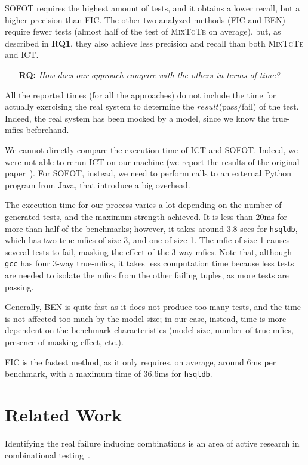 \documentclass[
12pt, %
oneside, %
english, %
singlespacing, %
headsepline, %
consistentlayout, %
]{MastersDoctoralThesis} %
\newcommand{\mix}{\textsc{MixTgTe}\xspace}
\newcommand{\truemfics}{true-\textsf{mfics}\xspace}
\newcommand{\mfic}{\textsf{mfic}\xspace}
\newcommand{\mfics}{\textsf{mfics}\xspace}
\newcommand{\result}{\ensuremath{\mathit{result}}\xspace}
\newcounter{researchquestionCount}
\newcommand{\researchquestion}[1]{\stepcounter{researchquestionCount}\begin{itemize}\item [\textbf{RQ\arabic{researchquestionCount}:}] \emph{#1}\end{itemize}}
\theoremstyle{plain}
\theoremstyle{definition}
\theoremstyle{remark}
\theoremstyle{plain}
\theoremstyle{plain}
\theoremstyle{remark}
\begin{document}
SOFOT requires the highest amount of tests, and it obtains a lower recall, but a higher precision than FIC. The other two analyzed methods (FIC and BEN) require fewer tests (almost half of the test of \mix on average), but, as described in {\bf RQ1}, they also achieve less precision and recall than both \mix and ICT.

\researchquestion{How does our approach compare with the others in terms of time?}

All the reported times (for all the approaches) do not include the time for actually exercising the real system to determine the \result (pass/fail) of the test. Indeed, the real system has been mocked by a model, since we know the \truemfics beforehand.

We cannot directly compare the execution time of ICT and SOFOT. Indeed, we were not able to rerun ICT on our machine (we report the results of the original paper~\cite{Niu2018interleaving}). For SOFOT, instead, we need to perform calls to an external Python program from Java, that introduce a big overhead.

The execution time for our process varies a lot depending on the number of generated tests, and the maximum strength achieved. It is less than 20ms for more than half of the benchmarks; however, it takes around 3.8 secs for \texttt{hsqldb}, which has two \truemfics of size 3, and one of size 1. The \mfic of size 1 causes several tests to fail, masking the effect of the 3-way \mfics. Note that, although \texttt{gcc} has four 3-way \truemfics, it takes less computation time because less tests are needed to isolate the \mfics from the other failing tuples, as more tests are passing.

Generally, BEN is quite fast as it does not produce too many tests, and the time is not affected too much by the model size; in our case, instead, time is more dependent on the benchmark characteristics (model size, number of \truemfics, presence of masking effect, etc.).

FIC is the fastest method, as it only requires, on average, around 6ms per benchmark, with a maximum time of 36.6ms for \texttt{hsqldb}.

\section{Related Work}\label{sec:related}

Identifying the real failure inducing combinations is an area of active research in combinational testing~\cite{nie_2011, kuhn_practical_2010}.
\end{document}
